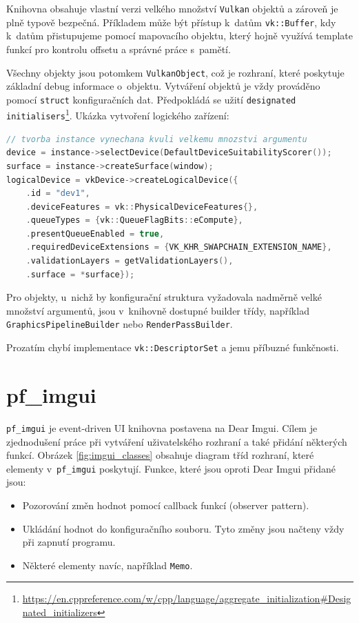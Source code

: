 Knihovna obsahuje vlastní verzi velkého množství \texttt{Vulkan} objektů a zároveň je plně typově bezpečná. Příkladem může být přístup k~datům \texttt{vk::Buffer}, kdy k~datům přistupujeme pomocí mapovacího objektu, který hojně využívá template funkcí pro kontrolu offsetu a správné práce s~pamětí.

Všechny objekty jsou potomkem \texttt{VulkanObject}, což je rozhraní, které poskytuje základní debug informace o~objektu. Vytváření objektů je vždy prováděno pomocí \texttt{struct} konfiguračních dat. Předpokládá se užití \texttt{designated initialisers}\footnote{\url{https://en.cppreference.com/w/cpp/language/aggregate_initialization#Designated_initializers}}. Ukázka vytvoření logického zařízení:

\begin{lstlisting}[language=C++, caption={Tvorba logického zařízení}]
// tvorba instance vynechana kvuli velkemu mnozstvi argumentu
device = instance->selectDevice(DefaultDeviceSuitabilityScorer());
surface = instance->createSurface(window);
logicalDevice = vkDevice->createLogicalDevice({
    .id = "dev1",
    .deviceFeatures = vk::PhysicalDeviceFeatures{},
    .queueTypes = {vk::QueueFlagBits::eCompute},
    .presentQueueEnabled = true,
    .requiredDeviceExtensions = {VK_KHR_SWAPCHAIN_EXTENSION_NAME},
    .validationLayers = getValidationLayers(),
    .surface = *surface});
\end{lstlisting}

Pro objekty, u~nichž by konfigurační struktura vyžadovala nadměrně velké množství argumentů, jsou v~knihovně dostupné builder třídy, například \texttt{GraphicsPipelineBuilder} nebo \texttt{RenderPassBuilder}.

Prozatím chybí implementace \texttt{vk::DescriptorSet} a jemu příbuzné funkčnosti.


\section{pf\_imgui}
\texttt{pf\_imgui} je event-driven UI knihovna postavena na Dear Imgui. Cílem je zjednodušení práce při vytváření uživatelského rozhraní a také přidání některých funkcí. Obrázek \ref{fig:imgui_classes} obsahuje diagram tříd rozhraní, které elementy v~\texttt{pf\_imgui} poskytují. Funkce, které jsou oproti Dear Imgui přidané jsou:

\begin{itemize}
	\item Pozorování změn hodnot pomocí callback funkcí (observer pattern).
	\item Ukládání hodnot do konfiguračního souboru. Tyto změny jsou načteny vždy při zapnutí programu.
	\item Některé elementy navíc, například \texttt{Memo}.
\end{itemize}


